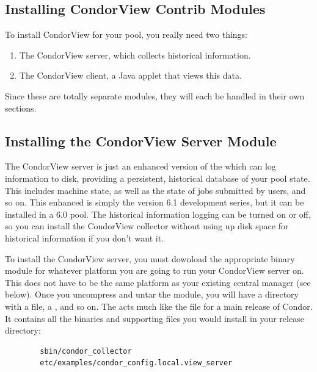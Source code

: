 \subsection{\label{sec:Contrib-CondorView-Install}
Installing CondorView Contrib Modules}

To install CondorView for your pool, you really need two things:
\begin{enumerate}
\item The CondorView server, which collects historical information.
\item The CondorView client, a Java applet that views this data.
\end{enumerate}

Since these are totally separate modules, they will each be handled in
their own sections.

\subsection{\label{sec:CondorView-Server-Install}
Installing the CondorView Server Module}

The CondorView server is just an enhanced version of the
 which can log information to disk, providing a 
persistent, historical database of your pool state.
This includes machine state, as well as the state of jobs submitted by
users, and so on.
This enhanced  is simply the version 6.1 development
series, but it can be installed in a 6.0 pool.
The historical information logging can be turned on or off, so you can
install the CondorView collector without using up disk space for
historical information if you don't want it.

To install the CondorView server, you must download the appropriate
binary module for whatever platform you are going to run your
CondorView server on.
This does not have to be the same platform as your existing central
manager (see below).
Once you uncompress and untar the module, you will have a directory
with a  file, a , and so on.
The  acts much like the  file
for a main release of Condor.
It contains all the binaries and supporting files you would install in
your release directory:
\begin{verbatim}
        sbin/condor_collector
        etc/examples/condor_config.local.view_server
\end{verbatim}

